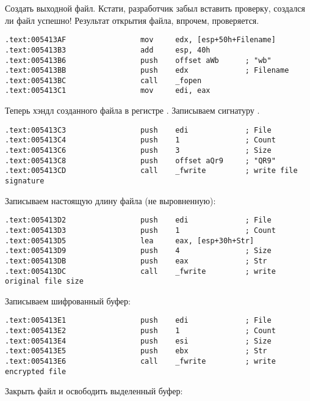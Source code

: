 Создать выходной файл. Кстати, разработчик забыл вставить проверку, создался ли файл успешно!
Результат открытия файла, впрочем, проверяется.

\begin{lstlisting}[style=customasm]
.text:005413AF                 mov     edx, [esp+50h+Filename]
.text:005413B3                 add     esp, 40h
.text:005413B6                 push    offset aWb      ; "wb"
.text:005413BB                 push    edx             ; Filename
.text:005413BC                 call    _fopen
.text:005413C1                 mov     edi, eax
\end{lstlisting}

Теперь хэндл созданного файла в регистре \EDI. Записываем сигнатуру .

\begin{lstlisting}[style=customasm]
.text:005413C3                 push    edi             ; File
.text:005413C4                 push    1               ; Count
.text:005413C6                 push    3               ; Size
.text:005413C8                 push    offset aQr9     ; "QR9"
.text:005413CD                 call    _fwrite         ; write file signature
\end{lstlisting}

Записываем настоящую длину файла (не выровненную):

\begin{lstlisting}[style=customasm]
.text:005413D2                 push    edi             ; File
.text:005413D3                 push    1               ; Count
.text:005413D5                 lea     eax, [esp+30h+Str]
.text:005413D9                 push    4               ; Size
.text:005413DB                 push    eax             ; Str
.text:005413DC                 call    _fwrite         ; write original file size
\end{lstlisting}

Записываем шифрованный буфер:

\begin{lstlisting}[style=customasm]
.text:005413E1                 push    edi             ; File
.text:005413E2                 push    1               ; Count
.text:005413E4                 push    esi             ; Size
.text:005413E5                 push    ebx             ; Str
.text:005413E6                 call    _fwrite         ; write encrypted file
\end{lstlisting}

Закрыть файл и освободить выделенный буфер:

